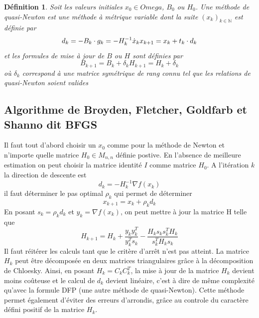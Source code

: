 \documentclass[3p, twocolumn]{elsarticle}
\newtheorem{definition}{Définition}[section]
\begin{document}
\begin{definition}
    Soit les valeurs initiales $x_0\in Omega$, $B_0$ ou $H_0$. Une méthode de quasi-Newton est une méthode à métrique variable dont la suite $(x_k)_{k\in \mathbb{N}}$ est définie par
    \begin{equation}
        d_k = -B_k\cdot g_k = -H_k^{-1}\dot x_k \\
        x_{k+1} = x_k + t_k\cdot d_k
    \end{equation}
    et les formules de mise à jour de $B$ ou $H$ sont définies par 
    \begin{equation}
        B_{k+1} = B_k + \delta_k
        H_{k+1} = H_k + \delta_k
    \end{equation}
    où $\delta_k$ correspond à une matrice symétrique de rang connu tel que les relations de quasi-Newton soient valides 
\end{definition}

\subsection{Algorithme de Broyden, Fletcher, Goldfarb et Shanno dit BFGS}
Il faut tout d'abord choisir un $x_{0}$ comme pour la méthode de Newton et n'importe quelle matrice $H_{0}\in M_{n,n}$ définie postive. En l'absence de meilleure estimation on peut choisir la matrice identité $I$ comme matrice $H_{0}$.
\newline
A l'itération $k$ la direction de descente est 
\begin{equation}
    d_{k}=-H_{k}^{-1}\nabla f(x_{k})
\end{equation}
il faut déterminer le pas optimal $\rho_{k}$ qui permet de déterminer
\begin{equation}
    x_{k+1}=x_{k}+\rho_{k}d_{k}
\end{equation}
En posant $s_{k}=\rho_{k}d_{k}$ et $y_{k}=\nabla f(x_{k})$, on peut mettre à jour la matrice H telle que
\begin{equation}
    H_{k+1} = H_{k} + \frac{y_{k}y_{k}^{T}}{y_{k}^{T}s_{k}}-\frac{H_{k}s_{k}s_{k}^{T}H_{k}}{s_{k}^{T}H_{k}s_{k}}
\end{equation}
Il faut réitérer les calculs tant que le critère d'arrêt n'est pas atteint.
\newline
La matrice $H_{k}$ peut être décomposée en deux matrices triangulaires grâce à la décomposition de Chloesky. Ainsi, en posant $H_{k}=C_{k}C_{k}^{T}$, la mise à jour de la matrice $H_{k}$ devient moins coûteuse et le calcul de $d_{k}$ devient linéaire, c'est à dire de même complexité qu'avec la formule DFP (une autre méthode de quasi-Newton). Cette méthode permet également d'éviter des erreurs d'arrondis, grâce au controle du caractère défini positif de la matrice $H_{k}$.
\end{document}
